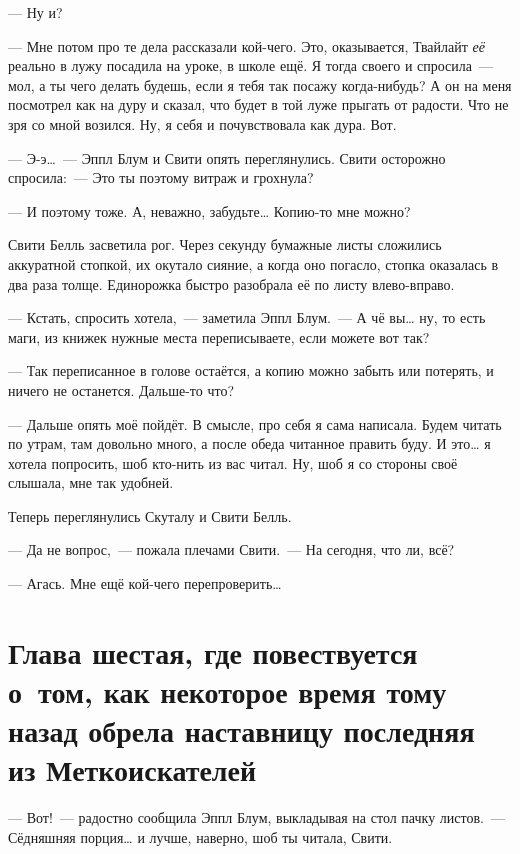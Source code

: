 \documentclass[fontsize=11pt,a5paper,titlepage=firstcover]{scrbook}
\begin{document}
--- Ну и?

--- Мне потом про те дела рассказали кой-чего. Это, оказывается, Твайлайт \emph{её} реально в лужу посадила на уроке, в школе ещё. Я тогда своего и спросила~--- мол, а ты чего делать будешь, если я тебя так посажу когда-нибудь? А он на меня посмотрел как на дуру и сказал, что будет в той луже прыгать от радости. Что не зря со мной возился. Ну, я себя и почувствовала как дура. Вот.

--- Э-э{\ldots}~--- Эппл Блум и Свити опять переглянулись. Свити осторожно спросила:~--- Это ты поэтому витраж и грохнула?

--- И поэтому тоже. А, неважно, забудьте{\ldots} Копию-то мне можно?

Свити Белль засветила рог. Через секунду бумажные листы сложились аккуратной стопкой, их окутало сияние, а когда оно погасло, стопка оказалась в два раза толще. Единорожка быстро разобрала её по листу влево-вправо.

--- Кстать, спросить хотела,~--- заметила Эппл Блум.~--- А чё вы{\ldots} ну, то есть маги, из книжек нужные места переписываете, если можете вот так?

--- Так переписанное в голове остаётся, а копию можно забыть или потерять, и ничего не останется. Дальше-то что?

--- Дальше опять моё пойдёт. В смысле, про себя я сама написала. Будем читать по утрам, там довольно много, а после обеда читанное править буду. И это{\ldots} я хотела попросить, шоб кто-нить из вас читал. Ну, шоб я со стороны своё слышала, мне так удобней.

Теперь переглянулись Скуталу и Свити Белль.

--- Да не вопрос,~--- пожала плечами Свити.~--- На сегодня, что ли, всё?

--- Агась. Мне ещё кой-чего перепроверить{\ldots}



\chapter*{Глава шестая, где повествуется о~том, как некоторое время тому назад обрела наставницу последняя из Меткоискателей}

--- Вот!~--- радостно сообщила Эппл Блум, выкладывая на стол пачку листов.~--- Сёдняшняя порция{\ldots} и лучше, наверно, шоб ты читала, Свити.
\end{document}

